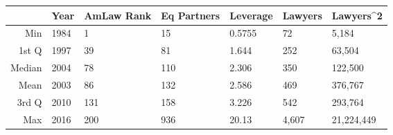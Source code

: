 \begin{table}[ht]
\centering
\begin{tabular}{rllllll}
  \hline
 & Year & AmLaw Rank & Eq Partners & Leverage & Lawyers & Lawyers^2 \\ 
  \hline
Min & 1984 & 1 & 15 & 0.5755 & 72 & 5,184 \\ 
  1st Q & 1997 & 39 & 81 & 1.644 & 252 & 63,504 \\ 
  Median & 2004 & 78 & 110 & 2.306 & 350 & 122,500 \\ 
  Mean & 2003 & 86 & 132 & 2.586 & 469 & 376,767 \\ 
  3rd Q & 2010 & 131 & 158 & 3.226 & 542 & 293,764 \\ 
  Max & 2016 & 200 & 936 & 20.13 & 4,607 & 21,224,449 \\ 
   \hline
\end{tabular}
\end{table}
